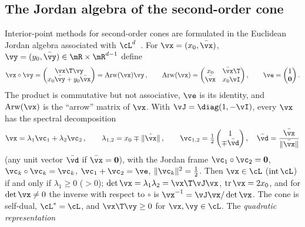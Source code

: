 \subsection{The Jordan algebra of the second-order cone}\label{sec:ec_jordan}
%
Interior-point methods for second-order cones are formulated in the Euclidean Jordan algebra associated with $\cL^d$~\cite{FarautKoranyi1994, AlizadehGoldfarb2003}. For $\vx = (x_0, \bar{\vx})$, $\vy = (y_0, \bar{\vy}) \in \mR \times \mR^{d-1}$ define
%
\begin{equation}\label{eq:ec_jordan_product}
	\vx \circ \vy = \begin{pmatrix} \vx\T\vy \\ x_0 \bar{\vy} + y_0 \bar{\vx} \end{pmatrix} = \operatorname{Arw}(\vx)\vy \, , \qquad
	\operatorname{Arw}(\vx) = \begin{pmatrix} x_0 & \bar{\vx}\T \\ \bar{\vx} & x_0 \vI \end{pmatrix} , \qquad
	\ve = \begin{pmatrix} 1 \\ \mathbf{0} \end{pmatrix} .
\end{equation}
%
The product is commutative but not associative, $\ve$ is its identity, and $\operatorname{Arw}(\vx)$ is the ``arrow'' matrix of $\vx$. With $\vJ = \diag(1, -\vI)$, every $\vx$ has the spectral decomposition
%
\begin{equation}\label{eq:ec_spectral}
	\vx = \lambda_1 \vc_1 + \lambda_2 \vc_2 \, , \qquad
	\lambda_{1,2} = x_0 \mp \|\bar{\vx}\| \, , \qquad
	\vc_{1,2} = \tfrac{1}{2}\begin{pmatrix} 1 \\ \mp\bar{\vd} \end{pmatrix} , \quad \bar{\vd} = \frac{\bar{\vx}}{\|\bar{\vx}\|}
\end{equation}
%
(any unit vector $\bar{\vd}$ if $\bar{\vx} = \mathbf{0}$), with the Jordan frame $\vc_1 \circ \vc_2 = \mathbf{0}$, $\vc_k \circ \vc_k = \vc_k$, $\vc_1 + \vc_2 = \ve$, $\|\vc_k\|^2 = \tfrac{1}{2}$. Then $\vx \in \cL$ ($\operatorname{int}\cL$) if and only if $\lambda_1 \geq 0$ ($> 0$); $\det\vx = \lambda_1\lambda_2 = \vx\T\vJ\vx$, $\operatorname{tr}\vx = 2x_0$, and for $\det\vx \neq 0$ the inverse with respect to $\circ$ is $\vx^{-1} = \vJ\vx / \det\vx$. The cone is self-dual, $\cL^* = \cL$, and $\vx\T\vy \geq 0$ for $\vx, \vy \in \cL$. The \emph{quadratic representation}
